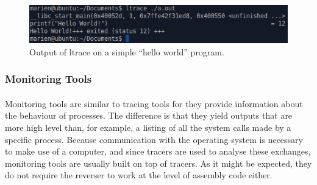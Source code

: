 \begin{figure}[!htb]
	\centering
	\includegraphics[width=1\textwidth]{reverse_engineering/ltrace.png}
	\caption{Output of ltrace on a simple “hello world” program.}
	\label{fig:ltrace}
\end{figure}

\subsubsection{Monitoring Tools}
\paragraph{}
Monitoring tools are similar to tracing tools for they provide information about the behaviour of processes. The difference is that they yield outputs that are more high level than, for example, a listing of all the system calls made by a specific process. Because communication with the operating system is necessary to make use of a computer, and since tracers are used to analyse these exchanges, monitoring tools are usually built on top of tracers. As it might be expected, they do not require the reverser to work at the level of assembly code either. 

